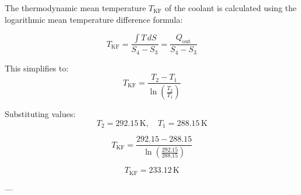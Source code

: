 The thermodynamic mean temperature \( T_{\text{KF}} \) of the coolant is calculated using the logarithmic mean temperature difference formula:  

\[
T_{\text{KF}} = \frac{\int T \, dS}{S_4 - S_3} = \frac{Q_{\text{out}}}{S_4 - S_3}
\]  

This simplifies to:  
\[
T_{\text{KF}} = \frac{T_2 - T_1}{\ln \left( \frac{T_2}{T_1} \right)}
\]  

Substituting values:  
\[
T_2 = 292.15 \, \text{K}, \quad T_1 = 288.15 \, \text{K}
\]  

\[
T_{\text{KF}} = \frac{292.15 - 288.15}{\ln \left( \frac{292.15}{288.15} \right)}
\]  

\[
T_{\text{KF}} = 233.12 \, \text{K}
\]  

---
